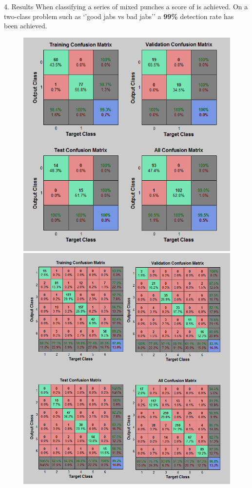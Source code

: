 \documentclass[ %
                    author={Liam O'Shea},
                supervisor={Dr. Sion Hannuna},
                     title={ZeroToHero},
                  subtitle={},
                    degree={Bsc},
                      year={2014} ]{poster}
\begin{document}
\begin{frame}{}
\begin{columns}[t]
    \begin{column}{0.422\linewidth}
    \begin{block}{\normalsize 4. Results}
    \small When classifying a series of mixed punches a score of  is achieved. On a two-class problem such as `'good jabs vs bad jabs'' a \textbf{99\%} detection rate has been achieved.
    \vspace{2.00mm}
    \begin{figure}[h]
        \includegraphics[height=0.15\textheight]{images/confm2}
        \vspace{1.00mm}
        \includegraphics[height=0.15\textheight]{images/confm6}

\end{figure}
\end{block}
\end{column}
\end{columns}
\end{frame}
\end{document}
